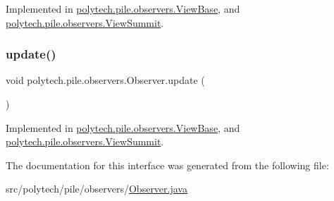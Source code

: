 Implemented in \hyperlink{classpolytech_1_1pile_1_1observers_1_1_view_base_a2f57cb278c30ac5971a977651f7e85e4}{polytech.\+pile.\+observers.\+View\+Base}, and \hyperlink{classpolytech_1_1pile_1_1observers_1_1_view_summit_a5906b18ace7f7c8ada6b7d396fe48f1d}{polytech.\+pile.\+observers.\+View\+Summit}.

\hypertarget{interfacepolytech_1_1pile_1_1observers_1_1_observer_afeb6abcefc917edee5d1f33bfb76e6b1}{}\label{interfacepolytech_1_1pile_1_1observers_1_1_observer_afeb6abcefc917edee5d1f33bfb76e6b1} 
\subsubsection{\texorpdfstring{update()}{update()}}
{\footnotesize\ttfamily void polytech.\+pile.\+observers.\+Observer.\+update (\begin{DoxyParamCaption}{ }\end{DoxyParamCaption})}



Implemented in \hyperlink{classpolytech_1_1pile_1_1observers_1_1_view_base_a1a3c482d6c7d84c19abd52e0b8ee217d}{polytech.\+pile.\+observers.\+View\+Base}, and \hyperlink{classpolytech_1_1pile_1_1observers_1_1_view_summit_a4d486c1e5589b2cba84ea9fee25befb5}{polytech.\+pile.\+observers.\+View\+Summit}.



The documentation for this interface was generated from the following file\+:\begin{DoxyCompactItemize}
\item 
src/polytech/pile/observers/\hyperlink{_observer_8java}{Observer.\+java}\end{DoxyCompactItemize}
